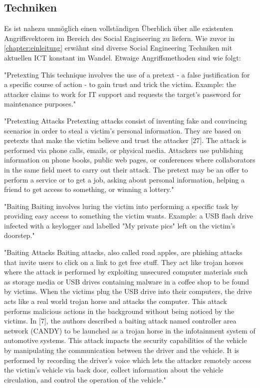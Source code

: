 \subsection{Techniken}

Es ist nahezu unmöglich einen vollständigen Überblich über alle existenten Angriffsvektoren im Bereich des Social Engineering
zu liefern. Wie zuvor in \autoref{chapter:einleitung} erwähnt sind diverse Social Engineering Techniken mit aktuellen ICT konstant im Wandel.
Etwaige Angriffsmethoden sind wie folgt:

"Pretexting
This technique involves the use of a pretext -  a false justification for a specific course of action - to gain
trust and trick the victim.
Example: the attacker claims to work for IT support and requests the target's password for maintenance purposes."\cite{1_enisa}

"Pretexting Attacks
Pretexting attacks consist of inventing fake and convincing scenarios in order to steal a victim’s personal information.
They are based on pretexts that make the victim believe and trust the attacker [27]. The attack is performed via phone calls,
emails, or physical media. Attackers use publishing information on phone books, public web pages, or conferences where collaborators
in the same field meet to carry out their attack. The pretext may be an offer to perform a service or to get a job,
asking about personal information, helping a friend to get access to something, or winning a lottery."\cite{4_mdpi}

"Baiting
Baiting involves luring the victim into performing a specific task by providing easy access to something the victim wants.
Example: a USB flash drive infected with a keylogger and labelled "My private pics" left on the victim's doorstep."\cite{1_enisa}

"Baiting Attacks
Baiting attacks, also called road apples, are phishing attacks that invite users to click on a link to get free stuff.
They act like trojan horses where the attack is performed by exploiting unsecured computer materials such as storage media
or USB drives containing malware in a coffee shop to be found by victims. When the victims plug the USB drive into their computers,
the drive acts like a real world trojan horse and attacks the computer. This attack performs malicious actions in the background
without being noticed by the victims.
In [7], the authors described a baiting attack named controller area network (CANDY) to be launched as a trojan horse in
the infotainment system of automotive systems. This attack impacts the security capabilities of the vehicle by manipulating the
communication between the driver and the vehicle. It is performed by recording the driver’s voice which lets the attacker remotely
access the victim’s vehicle via back door, collect information about the vehicle circulation, and control the operation of the vehicle."\cite{4_mdpi}

